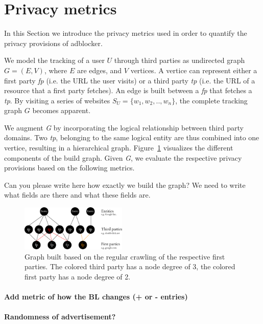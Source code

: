\documentclass{sig-alternate}
\begin{document}
\section{Privacy metrics} \label{sec:background}
In this Section we introduce the privacy metrics used in order to quantify the privacy provisions of adblocker.

We model the tracking of a user $U$ through third parties as undirected graph $G=(E,V)$, where $E$ are edges, and $V$ vertices. A vertice can represent either a first party \emph{fp} (i.e. the URL the user visits) or a third party \emph{tp} (i.e. the URL of a resource that a first party fetches). An edge is built between a \emph{fp} that fetches a \emph{tp}. By visiting a series of websites $S_U = \{w_1, w_2, .. , w_n\}$, the complete tracking graph $G$ becomes apparent.

We augment \emph{G} by incorporating the logical relationship between third party domains. Two \emph{tp}, belonging to the same logical entity are thus combined into one vertice, resulting in a hierarchical graph. Figure~\ref{fig:graph} visualizes the different components of the build graph. Given \emph{G}, we evaluate the respective privacy provisions based on the following metrics.

{\color{red}Can you please write here how exactly we build the graph? We need to write what fields are there and what these fields are.}

\begin{figure}[htb!]
  \centering
  \includegraphics[width=0.45\textwidth]{figures/graph.eps}
  \caption{Graph built based on the regular crawling of the respective first parties. The colored third party has a node degree of 3, the colored first party has a node degree of 2.}\label{fig:graph}
\end{figure}

\paragraph{Add metric of how the BL changes (+ or - entries)}
\paragraph{Randomness of advertisement?}
\end{document}
